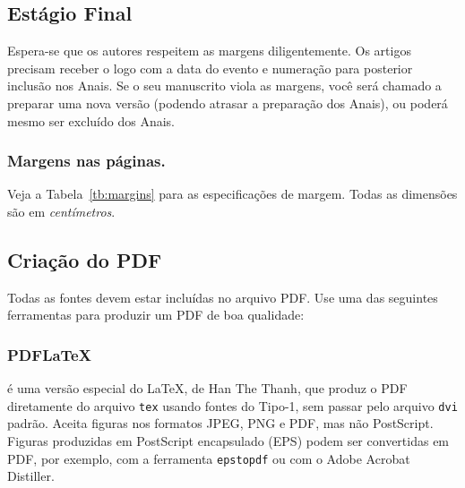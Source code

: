 \documentclass[a4paper]{ifacconf}
\begin{document}
\subsection{Estágio Final}

Espera-se que os autores respeitem as margens diligentemente. 
Os artigos precisam receber o logo com a data do evento e numeração para
posterior inclusão nos Anais. Se o seu manuscrito viola as margens, você será
chamado a preparar uma nova versão (podendo atrasar a preparação dos Anais), ou 
poderá mesmo ser excluído dos Anais. 


\subsubsection{Margens nas páginas.} Veja a Tabela~\ref{tb:margins} 
para as especificações de margem. Todas as dimensões são em 
\emph{centímetros}.


\subsection{Criação do PDF}

Todas as fontes devem estar incluídas no arquivo PDF. Use uma das seguintes
ferramentas para produzir um PDF de boa qualidade: 

\subsubsection{PDFLaTeX} 
é uma versão especial do \LaTeX, de Han The
Thanh, que produz o PDF diretamente do arquivo \texttt{tex} usando fontes do Tipo-1,
sem passar pelo arquivo \texttt{dvi} padrão. Aceita figuras nos formatos JPEG, PNG e PDF,
mas não PostScript. Figuras produzidas em PostScript encapsulado (EPS) podem
ser convertidas em PDF, por exemplo, com a ferramenta \texttt{epstopdf} ou
com o Adobe Acrobat
Distiller.


\end{document}
